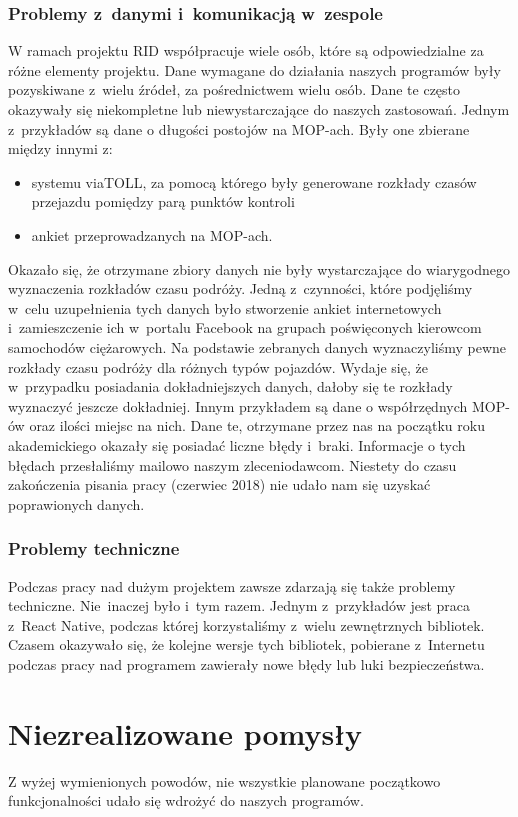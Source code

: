 \subsubsection{Problemy z~danymi i~komunikacją w~zespole}
W ramach projektu RID współpracuje wiele osób, które są odpowiedzialne za różne elementy projektu. 
Dane wymagane do działania naszych programów były pozyskiwane z~wielu źródeł, za pośrednictwem wielu osób. Dane te często okazywały się niekompletne lub niewystarczające do naszych zastosowań.
Jednym z~przykładów są dane o długości postojów na MOP-ach. Były one zbierane między innymi z:
\begin{itemize}
\item systemu viaTOLL, za pomocą którego były generowane rozkłady czasów przejazdu pomiędzy parą punktów kontroli
\item ankiet przeprowadzanych na MOP-ach. 
\end{itemize}
Okazało się, że otrzymane zbiory danych nie były wystarczające do wiarygodnego wyznaczenia rozkładów czasu podróży. Jedną z~czynności, które podjęliśmy w~celu uzupełnienia tych danych było stworzenie ankiet internetowych i~zamieszczenie ich w~portalu Facebook na grupach poświęconych kierowcom samochodów ciężarowych. Na podstawie zebranych danych wyznaczyliśmy pewne rozkłady czasu podróży dla różnych typów pojazdów. Wydaje się, że w~przypadku posiadania dokładniejszych danych, dałoby się te rozkłady wyznaczyć jeszcze dokładniej.
Innym przykładem są dane o współrzędnych MOP-ów oraz ilości miejsc na nich. Dane te, otrzymane przez nas na początku roku akademickiego okazały się posiadać liczne błędy i~braki. Informacje o tych błędach przesłaliśmy mailowo naszym zleceniodawcom. Niestety do czasu zakończenia pisania pracy (czerwiec 2018) nie udało nam się uzyskać poprawionych danych.
\subsubsection{Problemy techniczne}
Podczas pracy nad dużym projektem zawsze zdarzają się także problemy techniczne. Nie~inaczej było i~tym razem. 
Jednym z~przykładów jest praca z~React Native, podczas której korzystaliśmy z~wielu zewnętrznych bibliotek. Czasem okazywało się, że kolejne wersje tych bibliotek, pobierane z~Internetu podczas pracy nad programem zawierały nowe błędy lub luki bezpieczeństwa.

\section{Niezrealizowane pomysły}
Z wyżej wymienionych powodów, nie wszystkie planowane początkowo funkcjonalności udało się wdrożyć do naszych programów.
